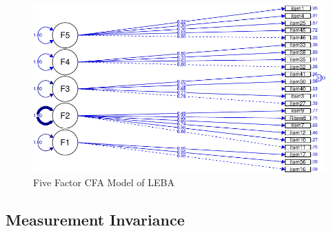 \documentclass[
  english,
  man]{apa6}
\begin{document}
\begin{figure}
\includegraphics[width=1\linewidth,height=1.5\textheight]{manuscript_files/figure-latex/figcfa-1} \caption{Five Factor CFA Model of LEBA}\label{fig:figcfa}
\end{figure}

\hypertarget{measurement-invariance}{%
\subsection{Measurement Invariance}\label{measurement-invariance}}
\end{document}
